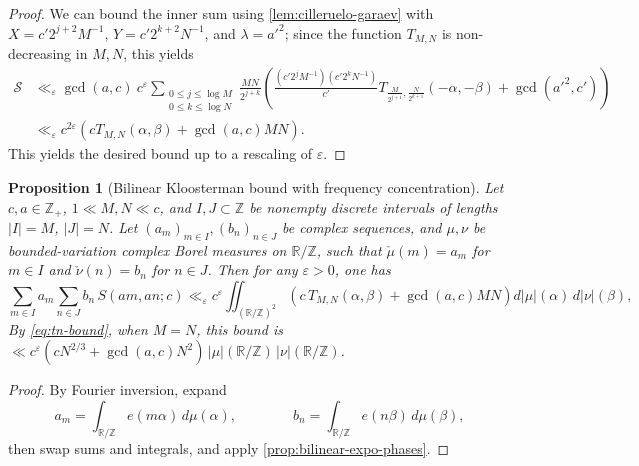 \documentclass[reqno,11pt]{amsart}
\newtheorem{proposition}[theorem]{Proposition}
\theoremstyle{remark}
\numberwithin{equation}{section}
\newcommand{\Z}{\mathbb{Z}}
\newcommand{\R}{\mathbb{R}}
\newcommand{\mS}{\mathcal{S}}
\newcommand{\eps}{\varepsilon}
\begin{document}
\begin{proof}
We can bound the inner sum using \cref{lem:cilleruelo-garaev} with $X = c' 2^{j+2} M^{-1}$, $Y = c' 2^{k+2} N^{-1}$, and $\lambda = a'^2$; since the function $T_{M,N}$ is non-decreasing in $M, N$, this yields
\[
\begin{aligned}
    \mS &\ll_\eps \gcd(a, c)\ c^\eps \sum_{\substack{0 \le j \le \log M \\ 0 \le k \le \log N}} \frac{MN}{2^{j+k}} \left(\frac{(c' 2^j M^{-1})(c' 2^k N^{-1})}{c'} T_{\frac{M}{2^{j+1}}, \frac{N}{2^{k+1}}}\left(-\alpha, -\beta\right) + \gcd(a'^2, c')\right)
    \\
    &\ll_\eps 
    c^{2\eps} \left(c T_{M, N}\left(\alpha, \beta\right) + \gcd(a, c) MN\right).
\end{aligned}
\]
This yields the desired bound up to a rescaling of $\eps$.
\end{proof}

\begin{proposition}[Bilinear Kloosterman bound with frequency concentration] \label{prop:bilinear-freq-concentration}
Let $c, a \in \Z_+$, $1 \ll M, N \ll c$, and $I, J \subset \Z$ be nonempty discrete intervals of lengths $|I| = M$, $|J| = N$. Let $(a_m)_{m \in I}, (b_n)_{n \in J}$ be complex sequences, and $\mu, \nu$ be bounded-variation complex Borel measures on $\R/\Z$, such that $\check{\mu}(m) = a_m$ for $m \in I$ and $\check{\nu}(n) = b_n$ for $n \in J$. Then for any $\eps > 0$, one has
\begin{equation} \label{eq:bilinear-freq-concentration}
    \sum_{m \in I} a_m \sum_{n \in J} b_n\, S(am, an; c) 
    \ll_\eps c^\eps
    \iint_{(\R/\Z)^2} \left(c\, T_{M,N}(\alpha, \beta) + \gcd(a, c) MN\right) d|\mu|(\alpha)\, d|\nu|(\beta),
\end{equation}
By \cref{eq:tn-bound}, when $M = N$, this bound is $\ll c^\eps (cN^{2/3} + \gcd(a, c) N^2)\, |\mu|(\R/\Z)\, |\nu|(\R/\Z)$.
\end{proposition}

\begin{proof}
By Fourier inversion, expand
\[
    a_m = \int_{\R/\Z} e(m\alpha)\, d\mu(\alpha),
    \qquad\qquad 
    b_n = \int_{\R/\Z} e(n\beta)\, d\mu(\beta),
\]
then swap sums and integrals, and apply \cref{prop:bilinear-expo-phases}.
\end{proof}
\end{document}
